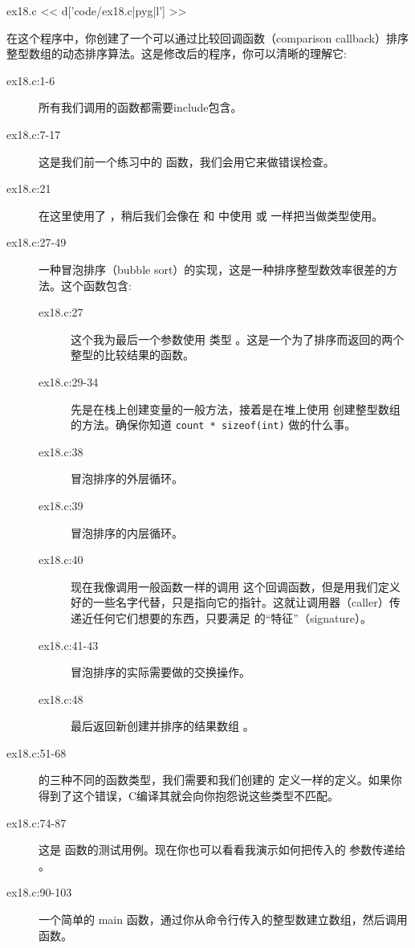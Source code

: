 \begin{code}{ex18.c}
<< d['code/ex18.c|pyg|l'] >>
\end{code}

在这个程序中，你创建了一个可以通过比较回调函数（comparison callback）排序整型数组的动态排序算法。这是修改后的程序，你可以清晰的理解它:

\begin{description}
\item[ex18.c:1-6] 所有我们调用的函数都需要include包含。
\item[ex18.c:7-17] 这是我们前一个练习中的  函数，我们会用它来做错误检查。
\item[ex18.c:21] 在这里使用了 ，稍后我们会像在  和  中使用  或  一样把当做类型使用。
\item[ex18.c:27-49] 一种冒泡排序（bubble sort）的实现，这是一种排序整型数效率很差的方法。这个函数包含:
    \begin{description}
    \item[ex18.c:27] 这个我为最后一个参数使用  类型 。这是一个为了排序而返回的两个整型的比较结果的函数。
    \item[ex18.c:29-34] 先是在栈上创建变量的一般方法，接着是在堆上使用  创建整型数组的方法。确保你知道 \verb|count * sizeof(int)| 做的什么事。
    \item[ex18.c:38] 冒泡排序的外层循环。
    \item[ex18.c:39] 冒泡排序的内层循环。
    \item[ex18.c:40] 现在我像调用一般函数一样的调用  这个回调函数，但是用我们定义好的一些名字代替，只是指向它的指针。这就让调用器（caller）传递近任何它们想要的东西，只要满足 的“特征”（signature）。
    \item[ex18.c:41-43] 冒泡排序的实际需要做的交换操作。
    \item[ex18.c:48] 最后返回新创建并排序的结果数组 。
    \end{description}
\item[ex18.c:51-68]  的三种不同的函数类型，我们需要和我们创建的  定义一样的定义。如果你得到了这个错误，C编译其就会向你抱怨说这些类型不匹配。
\item[ex18.c:74-87] 这是 函数的测试用例。现在你也可以看看我演示如何把传入的  参数传递给 。
\item[ex18.c:90-103] 一个简单的 main 函数，通过你从命令行传入的整型数建立数组，然后调用  函数。

\end{description}
